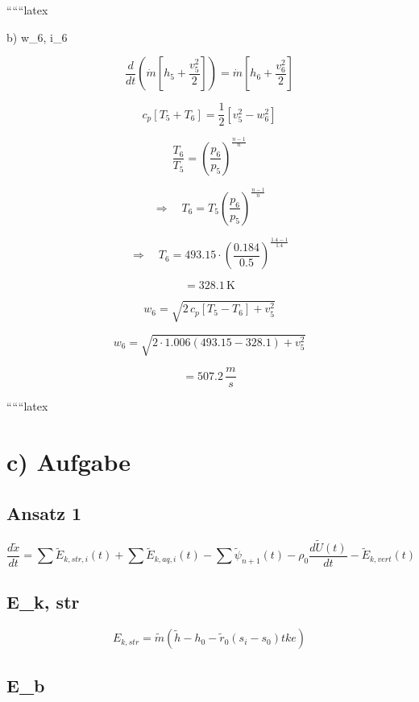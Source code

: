 ``````latex


b) \quad w_6, \; i_6

\[
\frac{d}{dt} \left( \dot{m} \left[ h_5 + \frac{v_5^2}{2} \right] \right) = \dot{m} \left[ h_6 + \frac{v_6^2}{2} \right]
\]

\[
c_p \left[ T_5 + T_6 \right] = \frac{1}{2} \left[ v_5^2 - w_6^2 \right]
\]

\[
\frac{T_6}{T_5} = \left( \frac{p_6}{p_5} \right)^{\frac{n-1}{n}}
\]

\[
\Rightarrow \quad T_6 = T_5 \left( \frac{p_6}{p_5} \right)^{\frac{n-1}{n}}
\]

\[
\Rightarrow \quad T_6 = 493.15 \cdot \left( \frac{0.184}{0.5} \right)^{\frac{1.4-1}{1.4}}
\]

\[
= 328.1 \, \text{K}
\]

\[
w_6 = \sqrt{2 \, c_p \left[ T_5 - T_6 \right] + v_5^2}
\]

\[
w_6 = \sqrt{2 \cdot 1.006 \left( 493.15 - 328.1 \right) + v_5^2}
\]

\[
= 507.2 \, \frac{m}{s}
\]

``````latex


\section*{c) Aufgabe}

\subsection*{Ansatz 1}

\begin{equation*}
\frac{d\tilde{x}}{dt} = \sum \tilde{E}_{k, str, i}(t) + \sum \tilde{E}_{k, aq, i}(t) - \sum \tilde{\psi}_{n+1}(t) - \rho_0 \frac{d\tilde{U}(t)}{dt} - \tilde{E}_{k, vert}(t)
\end{equation*}

\subsection*{E_k, str}

\begin{equation*}
E_{k, str} = \tilde{m} (\tilde{h} - h_0 - \tilde{r}_0 (s_i - s_0) tke)
\end{equation*}

\subsection*{E_b}


